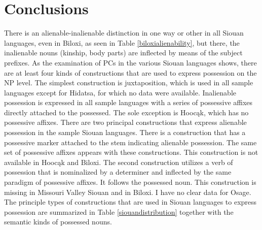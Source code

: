 \documentclass[output=paper]{LSP/langsci}
\begin{document}
\section{Conclusions}
There is an alienable-inalienable distinction in one way or other in all Siouan languages, even in Biloxi, as seen in Table \ref{biloxialienability}, but there, the inalienable nouns (kinship, body parts) are inflected by means of the subject prefixes. As the examination of PCs in the various Siouan languages shows, there are at least four kinds of constructions that are used to express possession on the NP level. The simplest construction is  juxtaposition, which is used in all sample languages except for Hidatsa, for which no data were available. Inalienable possession is expressed in all sample languages with a series of possessive affixes directly attached to the possessed. The sole exception is Hoocąk, which has no possessive affixes. There are two principal constructions that express alienable possession in the sample Siouan languages. There is a construction that has a possessive marker attached to the stem indicating alienable possession. The same set of possessive affixes appears with these constructions. This construction is not available in Hoocąk and Biloxi. The second construction utilizes a verb of possession that is nominalized by a determiner and inflected by the same paradigm of possessive affixes. It follows the possessed noun. This construction is missing in Missouri Valley Siouan and in Biloxi. I have no clear data for Osage. The principle types of constructions that are used in Siouan languages to express possession are summarized in Table \ref{siouandistribution} together with the semantic kinds of possessed nouns. 
\end{document}
